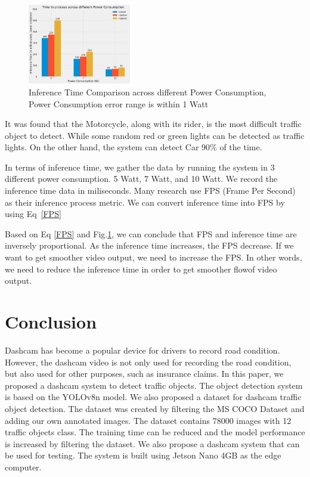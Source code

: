\documentclass[conference]{IEEEtran}
\begin{document}
\begin{figure}[h!]
\centering
\includegraphics[width=0.4\textwidth,keepaspectratio]{inference_time_comparison.png}
\caption{Inference Time Comparison across different Power Consumption, Power Consumption error range is within 1 Watt}
\label{fig:inference_time_comparison}
\end{figure}
It was found that the Motorcycle, along with its rider, is the most difficult traffic object to detect. While some random red or green lights can be detected as traffic lights.
On the other hand, the system can detect Car 90\% of the time.

In terms of inference time, we gather the data by running the system in 3 different power consumption. 5 Watt, 7 Watt, and 10 Watt. We record the inference time data in miliseconds.
Many research use  FPS (Frame Per Second) as their inference process metric. We can convert inference time into FPS by using Eq~\eqref{FPS}

Based on Eq \eqref{FPS} and Fig.\ref{fig:inference_time_comparison}, we can conclude that FPS and inference time are inversely proportional. As the inference time increases, the FPS decrease.
If we want to get smoother video output, we need to increase the FPS. In other words, we need to reduce the inference time in order to get smoother flowof video output\@.


\section{Conclusion}
Dashcam has become a popular device for drivers to record road condition. However, the dashcam video is not only used for recording the road condition, but also used for other purposes, such as insurance claims.
In this paper, we proposed a dashcam system to detect traffic objects. The object detection system is based on the YOLOv8n model. We also proposed a dataset for dashcam traffic object detection. The dataset was created by filtering the MS COCO Dataset and adding our own annotated images. The dataset contains 78000 images with 12 traffic objects class.
The training time can be reduced and the model performance is increased by filtering the dataset.
We also propose a dashcam system that can be used for testing. The system is built using Jetson Nano 4GB as the edge computer.
\end{document}
